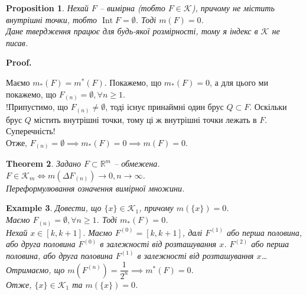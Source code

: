 \documentclass[a4paper, 10pt]{article}
\makeatletter
\def\qed{$\blacksquare$}
\theoremstyle{theoremdd}
\newtheorem{theorem}{Theorem}[subsection]
\theoremstyle{theoremdd}
\theoremstyle{theoremdd}
\theoremstyle{theoremdd}
\theoremstyle{theoremdd}
\newtheorem{example}[theorem]{Example}
\theoremstyle{theoremdd}
\theoremstyle{theoremdd}
\theoremstyle{theoremdd}
\theoremstyle{theoremdd}
\newtheorem{proposition}[theorem]{Proposition}
\theoremstyle{theoremdd}
\theoremstyle{theoremdd}
\theoremstyle{theoremdd}
\theoremstyle{theoremdd}
\theoremstyle{theoremdd}
\theoremstyle{theoremdd}
\renewenvironment{proof}[1][Proof.\\]{\par
\pushQED{\hfill \qed}%
\normalfont \topsep6\p@\@plus6\p@\relax
\trivlist
\item\relax
{\bfseries
#1\@addpunct{.}}\hspace\labelsep\ignorespaces
}{%
\popQED\endtrivlist\@endpefalse
}
\DeclareMathOperator{\Int}{Int}
\makeatother
\begin{document}
\begin{proposition}
Нехай $F$ -- вимірна (тобто $F \in \mathcal{K}$), причому не містить внутрішні точки, тобто $\Int F = \emptyset$. Тоді $m(F) = 0$.\\
\textit{Дане твердження працює для будь-якої розмірності, тому я індекс в $\mathcal{K}$ не писав.}
\end{proposition}

\begin{proof}
Маємо $m_*(F) = m^*(F)$. Покажемо, що $m_*(F) = 0$, а для цього ми покажемо, що $F_{(n)} = \emptyset, \forall n \geq 1$.\\
!Припустимо, що $F_{(n)} \neq \emptyset$, тоді існує принаймні один брус $Q \subset F$. Оскільки брус $Q$ містить внутрішні точки, тому ці ж внутрішні точки лежать в $F$. Суперечність!\\
Отже, $F_{(n)} = \emptyset \implies m_*(F) = 0 \implies m(F) = 0$.
\end{proof}

\begin{theorem}
Задано $F \subset \mathbb{R}^m$ -- обмежена.\\
$F \in \mathcal{K}_m \iff m(\Delta F_{(n)}) \to 0, n \to \infty$.\\
\textit{Переформулювання означення вимірної множини.}
\end{theorem}

\begin{example}
Довести, що $\{x\} \in \mathcal{K}_1$, причому $m(\{x\}) = 0$.\\
Маємо $F_{(n)} = \emptyset, \forall n \geq 1$. Тоді $m_*(F) = 0$.\\
Нехай $x \in [k,k+1]$. Маємо $F^{(0)} = [k,k+1]$, далі $F^{(1)}$ або перша половина, або друга половина $F^{(0)}$ в залежності від розташування $x$. $F^{(2)}$ або перша половина, або друга половина $F^{(1)}$ в залежності від розташування $x$\dots \\
Отримаємо, що $m(F^{(n)}) = \dfrac{1}{2^n} \implies m^*(F) = 0$.\\
Отже, $\{x\} \in \mathcal{K}_1$ та $m(\{x\}) = 0$.
\end{example}
\end{document}
